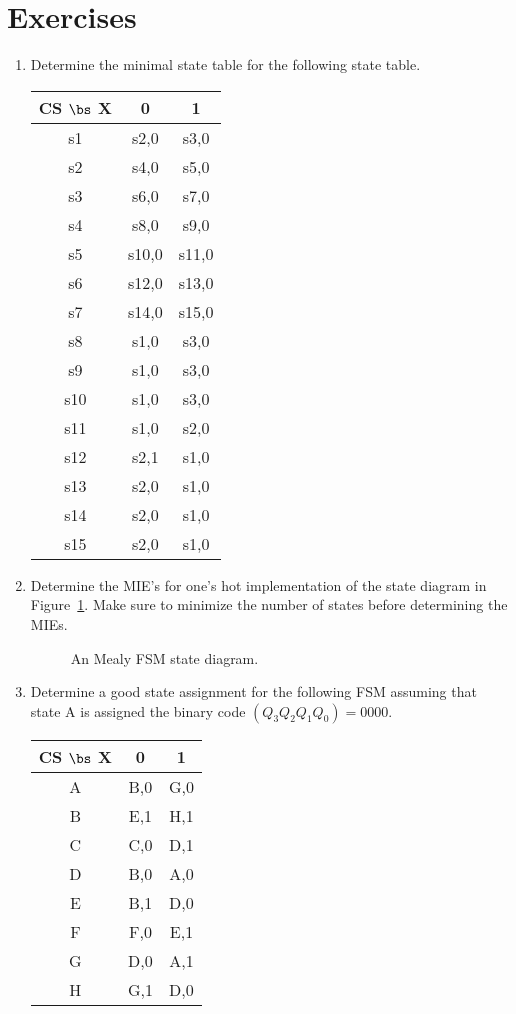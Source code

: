 \section{Exercises}
\begin{enumerate}

\item Determine the minimal state table for the following
state table.

\begin{tabular}{c||c|c}
CS $\bs$ X &  0     &  1 \\ \hline \hline
s1  &  s2,0  &  s3,0 \\ \hline
s2  &  s4,0  &  s5,0 \\ \hline
s3  &  s6,0  &  s7,0 \\ \hline
s4  &  s8,0  &  s9,0 \\ \hline
s5  &  s10,0 &  s11,0 \\ \hline
s6  &  s12,0 &  s13,0 \\ \hline
s7  &  s14,0 &  s15,0 \\ \hline
s8  &  s1,0  &  s3,0 \\ \hline
s9  &  s1,0  &  s3,0 \\ \hline
s10 &  s1,0  &  s3,0 \\ \hline
s11 &  s1,0  &  s2,0 \\ \hline
s12 &  s2,1  &  s1,0 \\ \hline
s13 &  s2,0  &  s1,0 \\ \hline
s14 &  s2,0  &  s1,0 \\ \hline
s15 &  s2,0  &  s1,0 \\ 
\end{tabular}


\item Determine the MIE's for one's hot implementation of the state
diagram in Figure~\ref{fig:MinState}.  Make sure to minimize the 
number of states before determining the MIEs.
\begin{figure}[ht]
\centerline{}
\caption{An Mealy FSM state diagram.}
\label{fig:MinState}
\end{figure}

\item Determine a good state assignment for the following FSM assuming
that state A is assigned the binary code $(Q_3 Q_2 Q_1 Q_0) = 0000$.

\begin{tabular}{c||c|c}
CS $\bs$ X&  0    &  1 \\ \hline \hline
A   &  B,0  &  G,0 \\ \hline
B   &  E,1  &  H,1 \\ \hline
C   &  C,0  &  D,1 \\ \hline
D   &  B,0  &  A,0 \\ \hline
E   &  B,1  &  D,0 \\ \hline
F   &  F,0  &  E,1 \\ \hline
G   &  D,0  &  A,1 \\ \hline
H   &  G,1  &  D,0 \\ 
\end{tabular}



\end{enumerate}
